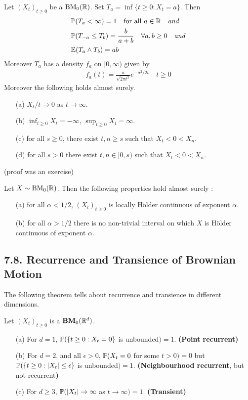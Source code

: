\documentclass[10pt,a4paper]{report}
\begin{document}
 Let $(X_t)_{t\geq 0}$ be a $\text{BM}_0(\mathbb{R})$. Set $T_a = \inf \{t\geq 0 : X_t =a \}$. Then
\begin{align*}
& \mathbb{P}(T_a < \infty) =1 \quad \text{for all } a\in \mathbb{R} \quad \text{\emph{and}} \\
& \mathbb{P}(T_{-a} \leq T_b) = \frac{b}{a+b} \quad \forall a,b\geq 0 \quad \text{\emph{and}} \\
& \mathbb{E}(T_a \wedge T_b) = ab
\end{align*}
Moreover $T_a$ has a density $f_a$ on $[0,\infty)$ given by
\begin{align*}
f_a(t) = \frac{a}{\sqrt{2\pi t^3}} e^{-a^2/2t} \quad t\geq 0
\end{align*}
Moreover the following holds almost surely.
\begin{itemize}
\item[(a)] $X_{t} /t \rightarrow 0$ as $t\rightarrow \infty$.
\item[(b)] $\inf_{t\geq 0} X_t = -\infty$, $\sup_{t\geq 0} X_t =\infty$. 
\item[(c)] for all $s\geq 0$, there exist $t,n\geq s$ such that $X_t < 0 < X_n$.
\item[(d)] for all $s>0$ there exist $t,n \in [0,s)$ such that $X_t < 0<X_n$.
\end{itemize}
(proof was an exercise)
\s

 Let $X \sim \text{BM}_0(\mathbb{R})$. Then the following properties hold almost surely : 
\begin{itemize}
\item[(a)] for all $\alpha < 1/2$, $(X_t)_{t\geq 0}$ is locally H\"{o}lder continuous of exponent $\alpha$.
\item[(b)] for all $\alpha >1/2$ there is no non-trivial interval on which $X$ is H\"{o}lder continuous of exponent $\alpha$.
\end{itemize}

\subsection*{7.8. Recurrence and Transience of Brownian Motion}

The following theorem tells about recurrence and transience in different dimensions.
\s

 Let $(X_t)_{t\geq 0}$ is a $\textbf{BM}_0(\mathbb{R}^d)$.
\begin{itemize}
\item[(a)] For $d=1$, $\mathbb{P}(\{t\geq 0 : X_t =0 \}$ is unbounded$) =1$. \textbf{(Point recurrent)}
\item[(b)] For $d=2$, and all $\epsilon>0$, $\mathbb{P} (X_t =0$ for some $t>0) =0$ but $\mathbb{P}(\{ t\geq 0 : |X_t| \leq \epsilon \}$ is unbounded$)=1$. \textbf{(Neighbourhood recurrent}, but not recurrent\textbf{)}
\item[(c)] For $d\geq 3$, $\mathbb{P}(|X_t| \rightarrow \infty$ as $t\rightarrow \infty ) =1$. \textbf{(Transient)}
\end{itemize}
\end{document}
